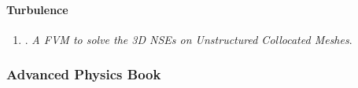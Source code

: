 \documentclass{article}
\begin{document}
\paragraph{Turbulence}

\begin{enumerate}
	\item \cite{Perron_Boivin_Herard2004}. {\it A FVM to solve the 3{D} NSEs on Unstructured Collocated Meshes}.\hfill{\sf[reading]}
\end{enumerate}


\subsubsection{Advanced Physics Book}
\end{document}
